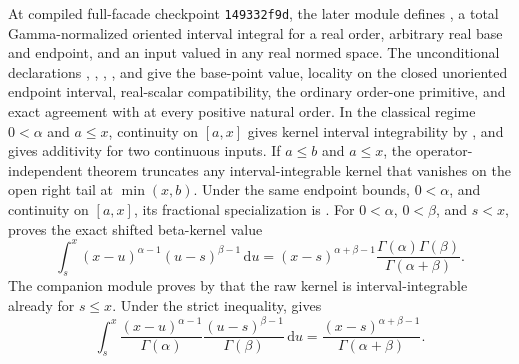 \documentclass[11pt,oneside]{article}
\theoremstyle{definition}
\theoremstyle{remark}
\newcommand{\dd}{\,\mathrm d}
\newcommand{\1}{\mathbf 1}
\begin{document}
\begin{statusbox}
At compiled full-facade checkpoint \texttt{149332f9d}, the later module
 defines
, a total Gamma-normalized oriented interval integral for
a real order, arbitrary real base and endpoint, and an input valued in any real normed
space.  The unconditional declarations
,
,
,
, and
 give the base-point value, locality on the
closed unoriented endpoint interval, real-scalar compatibility, the ordinary order-one
primitive, and exact agreement with  at every positive natural
order.  In the classical regime \(0<\alpha\) and \(a\le x\), continuity on \([a,x]\)
gives kernel interval integrability by
, and
 gives additivity for two continuous inputs.
If \(a\le b\) and \(a\le x\), the operator-independent theorem
 truncates any
interval-integrable kernel that vanishes on the open right tail at \(\min(x,b)\).
Under the same endpoint bounds, \(0<\alpha\), and continuity on \([a,x]\), its fractional
specialization is
.
For \(0<\alpha\), \(0<\beta\), and \(s<x\),
 proves the exact shifted
beta-kernel value
\begin{equation}
 \int_s^x(x-u)^{\alpha-1}(u-s)^{\beta-1}\dd u
 =(x-s)^{\alpha+\beta-1}
   \frac{\Gamma(\alpha)\Gamma(\beta)}{\Gamma(\alpha+\beta)}.
 \label{p0:eq:fractional-volterra-beta-kernel}
\end{equation}
The companion module  proves by
 that the raw kernel is
interval-integrable already for \(s\le x\).  Under the strict inequality,
 gives
\begin{equation}
 \int_s^x
 \frac{(x-u)^{\alpha-1}}{\Gamma(\alpha)}
 \frac{(u-s)^{\beta-1}}{\Gamma(\beta)}\dd u
 =\frac{(x-s)^{\alpha+\beta-1}}{\Gamma(\alpha+\beta)}.
 \label{p0:eq:fractional-volterra-normalized-beta-kernel}
\end{equation}

\end{statusbox}
\end{document}
